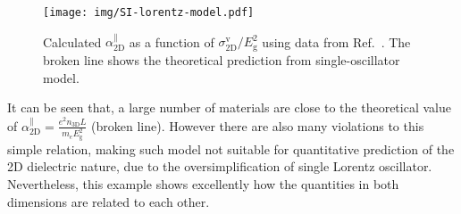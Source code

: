 \documentclass[journal=ancac3,email=true,hyperref=true,keywords=false]{achemso}
\begin{document}
\begin{figure}[htbp]
  \centering
  \texttt{[image: img/SI-lorentz-model.pdf]}
  \caption{Calculated $\alpha_{\mathrm{2D}}^{\parallel}$ as a function of
    $\sigma_{\mathrm{2D}}^{\mathrm{v}}/E_{\mathrm{g}}^{2}$ using data from Ref.~. The broken line shows the theoretical prediction
    from single-oscillator model.}
  \label{fig:plasma}
\end{figure}
It can be seen that, a large number of materials are close to the
theoretical value of
$\alpha_{\mathrm{2D}}^{\parallel} = \frac{e^{2} n_{\mathrm{3D}} L}{m_{e}
  E_{\mathrm{g}}^{2}}$ (broken line). However there are also many
violations to this simple relation, making such model not suitable for
quantitative prediction of the 2D dielectric nature, due to the
oversimplification of single Lorentz oscillator. Nevertheless, this
example shows excellently how the quantities in both dimensions are
related to each other.
\end{document}
